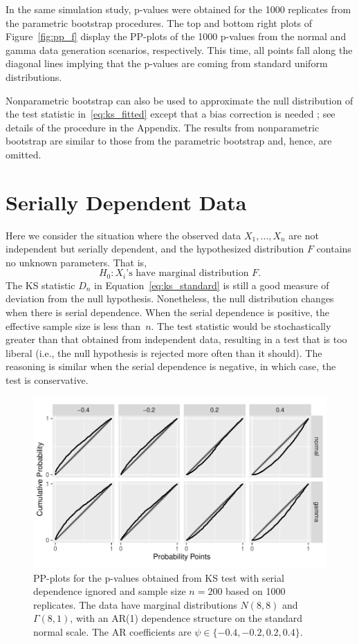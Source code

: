 \documentclass[12pt, letterpaper]{article}
\begin{document}
In the same simulation study, p-values were obtained for the 1000 replicates
from the parametric bootstrap procedures. The top and bottom right plots of 
Figure~\ref{fig:pp_f} display the PP-plots of the 1000
p-values from the normal and gamma data generation scenarios,
respectively. This time, all points fall along the diagonal lines implying that
the p-values are coming from standard uniform distributions.


Nonparametric bootstrap can also be used to approximate the null distribution
of the test statistic in~\eqref{eq:ks_fitted} except that a bias correction is 
needed \citep{babu2004goodness}; see details of the procedure
in the Appendix. The results from nonparametric bootstrap are similar to those
from the parametric bootstrap and, hence, are omitted.


\section{Serially Dependent Data}
\label{sec:dependence}

Here we consider the situation where the observed data $X_1, \ldots, X_n$ are
not independent but serially dependent, and the hypothesized distribution $F$
contains no unknown parameters. That is,
\[
H_0: \text{$X_i$'s have marginal distribution $F$.}
\]
The KS statistic $D_n$ in Equation~\eqref{eq:ks_standard}
is still a good measure of deviation from the null hypothesis. Nonetheless, the
null distribution changes when there is serial dependence.
When the serial dependence is
positive, the effective sample size is less than~$n$. The test statistic
would be stochastically greater than that obtained from independent data, 
resulting in a test that is too liberal (i.e., the null hypothesis is rejected
more often than it should). The reasoning is similar when the serial dependence 
is negative, in which case, the test is conservative.


\begin{figure}[tbp]
  \centering
  \includegraphics[width=\textwidth]{pp_s.pdf}
  \caption{PP-plots for the p-values obtained from KS test with serial
    dependence ignored and sample size $n = 200$ based on 1000
    replicates. The data have marginal distributions $N(8, 8)$ and
    $\Gamma(8, 1)$, with an AR(1) dependence structure on the standard normal
    scale. The AR coefficients are $\psi \in \{-0.4, -0.2,  0.2,  0.4\}$.
  }
  \label{fig:pp_s}
\end{figure}
\end{document}
